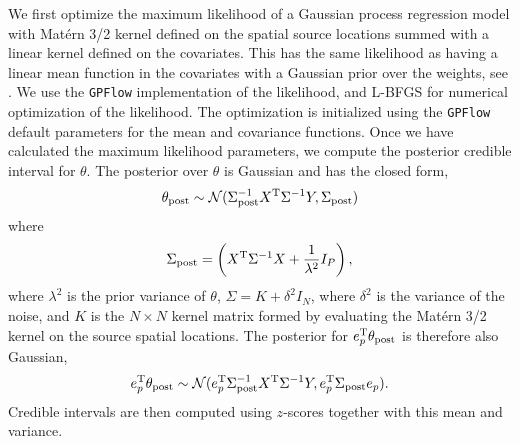 We first optimize the maximum likelihood of a Gaussian process regression model with Mat\'ern 3/2 kernel defined on the spatial source locations summed with a linear kernel defined on the covariates. This has the same likelihood as having a linear mean function in the covariates with a Gaussian prior over the weights, see \citet[Page 28]{Rasmussen2006Gaussian}. We use the \texttt{GPFlow} \citep{GPflow2017} implementation of the likelihood, and L-BFGS \citep{liu_1989_lbfgs} for numerical optimization of the likelihood. The optimization is initialized using the \texttt{GPFlow} default parameters for the mean and covariance functions. Once we have calculated the maximum likelihood parameters, we compute the posterior credible interval for $\theta$. The posterior over $\theta$ is Gaussian and has the closed form,
\begin{align}
    \theta_{\mathrm{post}} \sim \mathcal{N}(\Sigma_{\mathrm{post}}^{-1}X^{\mathrm{T}}\Sigma^{-1}Y, \Sigma_{\mathrm{post}})
\end{align}
where 
\begin{align}
    \Sigma_{\mathrm{post}} = \left(X^{\mathrm{T}}\Sigma^{-1} X + \frac{1}{\lambda^2}I_P\right),
\end{align}
where $\lambda^2$ is the prior variance of $\theta$, $\Sigma = K + \delta^2 I_N$, where $\delta^2$ is the variance of the noise, and $K$ is the $N \times N$ kernel matrix formed by evaluating the Mat\'ern 3/2 kernel on the source spatial locations. The posterior for $e_p^{\mathrm{T}}\theta_{\mathrm{post}}$ is therefore also Gaussian, 
\begin{align}
    e_p^{\mathrm{T}}\theta_{\mathrm{post}} \sim \mathcal{N}(e_p^{\mathrm{T}}\Sigma_{\mathrm{post}}^{-1}X^{\mathrm{T}}\Sigma^{-1}Y, e_p^{\mathrm{T}}\Sigma_{\mathrm{post}}e_p). 
\end{align}
Credible intervals are then computed using $z$-scores together with this mean and variance. 
